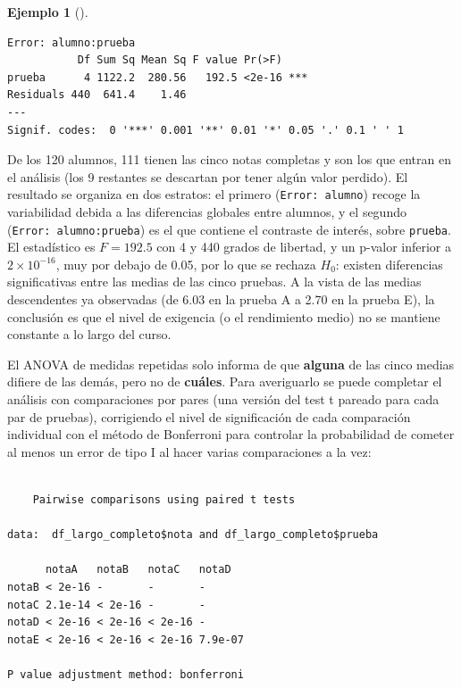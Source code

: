 \documentclass[
  spanish,
  a4paper,
]{scrreport}
\newenvironment{Shaded}{\begin{snugshade}}{\end{snugshade}}
\newcommand{\AttributeTok}[1]{\textcolor[rgb]{0.40,0.45,0.13}{#1}}
\newcommand{\ConstantTok}[1]{\textcolor[rgb]{0.56,0.35,0.01}{#1}}
\newcommand{\FunctionTok}[1]{\textcolor[rgb]{0.28,0.35,0.67}{#1}}
\newcommand{\NormalTok}[1]{\textcolor[rgb]{0.00,0.23,0.31}{#1}}
\newcommand{\SpecialCharTok}[1]{\textcolor[rgb]{0.37,0.37,0.37}{#1}}
\newcommand{\StringTok}[1]{\textcolor[rgb]{0.13,0.47,0.30}{#1}}
\theoremstyle{definition}
\newtheorem{example}{Ejemplo}[chapter]
\theoremstyle{definition}
\theoremstyle{remark}
\begin{document}
\begin{example}[]
\begin{verbatim}
Error: alumno:prueba
           Df Sum Sq Mean Sq F value Pr(>F)    
prueba      4 1122.2  280.56   192.5 <2e-16 ***
Residuals 440  641.4    1.46                   
---
Signif. codes:  0 '***' 0.001 '**' 0.01 '*' 0.05 '.' 0.1 ' ' 1
\end{verbatim}

De los 120 alumnos, 111 tienen las cinco notas completas y son los que
entran en el análisis (los 9 restantes se descartan por tener algún
valor perdido). El resultado se organiza en dos estratos: el primero
(\texttt{Error:\ alumno}) recoge la variabilidad debida a las
diferencias globales entre alumnos, y el segundo
(\texttt{Error:\ alumno:prueba}) es el que contiene el contraste de
interés, sobre \texttt{prueba}. El estadístico es \(F=192.5\) con 4 y
440 grados de libertad, y un p-valor inferior a \(2\times10^{-16}\), muy
por debajo de 0.05, por lo que se rechaza \(H_0\): existen diferencias
significativas entre las medias de las cinco pruebas. A la vista de las
medias descendentes ya observadas (de 6.03 en la prueba A a 2.70 en la
prueba E), la conclusión es que el nivel de exigencia (o el rendimiento
medio) no se mantiene constante a lo largo del curso.

\end{example}

El ANOVA de medidas repetidas solo informa de que \textbf{alguna} de las
cinco medias difiere de las demás, pero no de \textbf{cuáles}. Para
averiguarlo se puede completar el análisis con comparaciones por pares
(una versión del test t pareado para cada par de pruebas), corrigiendo
el nivel de significación de cada comparación individual con el método
de Bonferroni para controlar la probabilidad de cometer al menos un
error de tipo I al hacer varias comparaciones a la vez:

\begin{Shaded}
\end{Shaded}

\begin{verbatim}

    Pairwise comparisons using paired t tests 

data:  df_largo_completo$nota and df_largo_completo$prueba 

      notaA   notaB   notaC   notaD  
notaB < 2e-16 -       -       -      
notaC 2.1e-14 < 2e-16 -       -      
notaD < 2e-16 < 2e-16 < 2e-16 -      
notaE < 2e-16 < 2e-16 < 2e-16 7.9e-07

P value adjustment method: bonferroni 
\end{verbatim}
\end{document}

